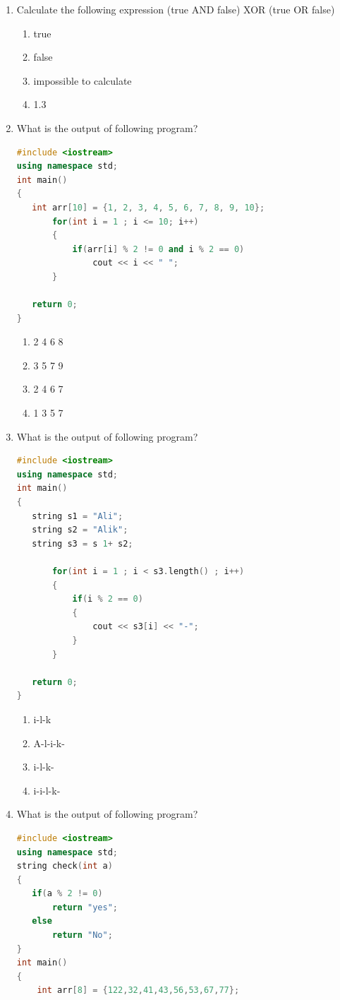 \documentclass[10pt]{article}
\begin{document}
\begin{enumerate}
\item Calculate the following expression (true AND false) XOR (true OR false) 
\begin{enumerate}
    \item true
    \item false
    \item impossible to calculate
    \item 1.3
\end{enumerate}



\item What is the output of following program?
\begin{lstlisting}[language=C++]
#include <iostream>
using namespace std;
int main()
{
   int arr[10] = {1, 2, 3, 4, 5, 6, 7, 8, 9, 10};
       for(int i = 1 ; i <= 10; i++)
       {
           if(arr[i] % 2 != 0 and i % 2 == 0)
               cout << i << " ";
       }
 
   return 0;
}
\end{lstlisting}
\begin{enumerate}
    \item 2 4 6 8
    \item 3 5 7 9
    \item 2 4 6 7
    \item 1 3 5 7
\end{enumerate}


\item What is the output of following program?
\begin{lstlisting}[language=C++]
#include <iostream>
using namespace std;
int main()
{
   string s1 = "Ali";
   string s2 = "Alik";
   string s3 = s 1+ s2;
 
       for(int i = 1 ; i < s3.length() ; i++)
       {
           if(i % 2 == 0)
           {
               cout << s3[i] << "-";
           }
       }
  
   return 0;
}
\end{lstlisting}
\begin{enumerate}
    \item i-l-k
    \item A-l-i-k-
    \item i-l-k-
    \item i-i-l-k-
\end{enumerate}


\item What is the output of following program?
\begin{lstlisting}[language=C++]
#include <iostream>
using namespace std;
string check(int a)
{
   if(a % 2 != 0)
       return "yes";
   else
       return "No";
}
int main()
{
    int arr[8] = {122,32,41,43,56,53,67,77};
 

\end{lstlisting}
\end{enumerate}
\end{document}
